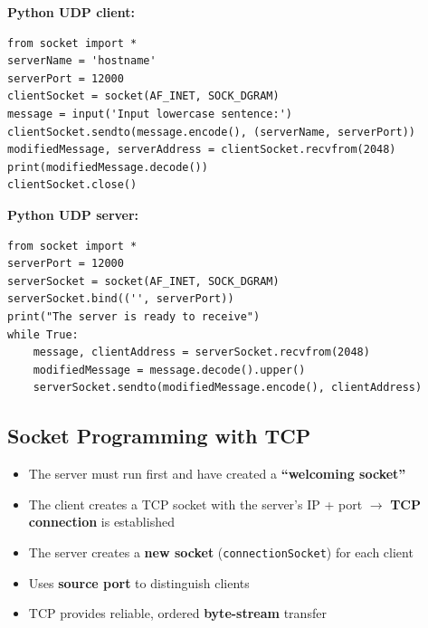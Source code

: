 \textbf{Python UDP client:}
\begin{lstlisting}
from socket import *
serverName = 'hostname'
serverPort = 12000
clientSocket = socket(AF_INET, SOCK_DGRAM)
message = input('Input lowercase sentence:')
clientSocket.sendto(message.encode(), (serverName, serverPort))
modifiedMessage, serverAddress = clientSocket.recvfrom(2048)
print(modifiedMessage.decode())
clientSocket.close()
\end{lstlisting}

\textbf{Python UDP server:}
\begin{lstlisting}
from socket import *
serverPort = 12000
serverSocket = socket(AF_INET, SOCK_DGRAM)
serverSocket.bind(('', serverPort))
print("The server is ready to receive")
while True:
    message, clientAddress = serverSocket.recvfrom(2048)
    modifiedMessage = message.decode().upper()
    serverSocket.sendto(modifiedMessage.encode(), clientAddress)
\end{lstlisting}

\subsection{Socket Programming with TCP}

\begin{keybox}
\begin{itemize}[noitemsep]
    \item The server must run first and have created a \textbf{``welcoming socket''}
    \item The client creates a TCP socket with the server's IP + port $\rightarrow$ \textbf{TCP connection} is established
    \item The server creates a \textbf{new socket} (\texttt{connectionSocket}) for each client
    \item Uses \textbf{source port} to distinguish clients
    \item TCP provides reliable, ordered \textbf{byte-stream} transfer
\end{itemize}
\end{keybox}


